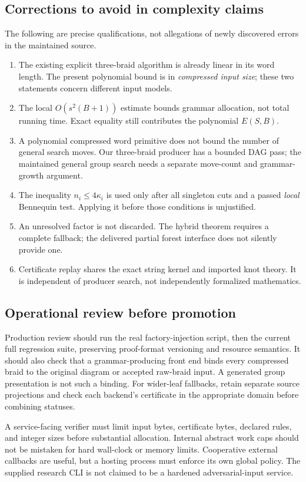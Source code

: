 \documentclass[11pt,letterpaper]{article}
\theoremstyle{definition}\newtheorem{definition}[theorem]{Definition}
\theoremstyle{remark}\newtheorem{remark}[theorem]{Remark}
\begin{document}
\subsection{Corrections to avoid in complexity claims}
The following are precise qualifications, not allegations of newly discovered errors in the maintained source.
\begin{enumerate}
\item The existing explicit three-braid algorithm is already linear in its word length. The present polynomial bound is in \emph{compressed input size}; these two statements concern different input models.
\item The local $O(s^2(B+1))$ estimate bounds grammar allocation, not total running time. Exact equality still contributes the polynomial $E(S,B)$.
\item A polynomial compressed word primitive does not bound the number of general search moves. Our three-braid producer has a bounded DAG pass; the maintained general group search needs a separate move-count and grammar-growth argument.
\item The inequality $n_i\le4\kappa_i$ is used only after all singleton cuts and a passed \emph{local} Bennequin test. Applying it before those conditions is unjustified.
\item An unresolved factor is not discarded. The hybrid theorem requires a complete fallback; the delivered partial forest interface does not silently provide one.
\item Certificate replay shares the exact string kernel and imported knot theory. It is independent of producer search, not independently formalized mathematics.
\end{enumerate}

\subsection{Operational review before promotion}
Production review should run the real factory-injection script, then the current full regression suite, preserving proof-format versioning and resource semantics. It should also check that a grammar-producing front end binds every compressed braid to the original diagram or accepted raw-braid input. A generated group presentation is not such a binding. For wider-leaf fallbacks, retain separate source projections and check each backend's certificate in the appropriate domain before combining statuses.

A service-facing verifier must limit input bytes, certificate bytes, declared rules, and integer sizes before substantial allocation. Internal abstract work caps should not be mistaken for hard wall-clock or memory limits. Cooperative external callbacks are useful, but a hosting process must enforce its own global policy. The supplied research CLI is not claimed to be a hardened adversarial-input service.
\end{document}
